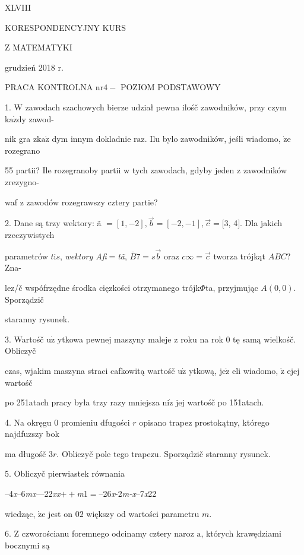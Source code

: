 \documentclass[a4paper,12pt]{article}
\begin{document}
XLVIII

KORESPONDENCYJNY KURS

Z MATEMATYKI

grudzień 2018 r.

PRACA KONTROLNA $\mathrm{n}\mathrm{r} 4-$ POZIOM PODSTAWOWY

1. $\mathrm{W}$ zawodach szachowych bierze udział pewna ilośč zawodników, przy czym $\mathrm{k}\mathrm{a}\dot{\mathrm{z}}\mathrm{d}\mathrm{y}$ zawod-

nik gra $\mathrm{z}\mathrm{k}\mathrm{a}\dot{\mathrm{z}}$ dym innym dokladnie $\mathrm{r}\mathrm{a}\mathrm{z}$. Ilu bylo zawodników, jeśli wiadomo, $\dot{\mathrm{z}}\mathrm{e}$ rozegrano

55 partii? Ile rozegranoby partii $\mathrm{w}$ tych zawodach, gdyby jeden $\mathrm{z}$ zawodników zrezygno-

waf $\mathrm{z}$ zawodów rozegrawszy cztery partie?

2. Dane są trzy wektory: ã $= [1,-2], \vec{b}= [-2,-1], \vec{c}= [3$, 4$]$. Dla jakich rzeczywistych

parametrów $t\mathrm{i}s$, {\it wektory Afi}$=${\it tã}, $\overline{B}7=s\vec{b}$ oraz $c\infty=\vec{c}$ tworza trójkąt $ABC$? Zna-

lez/č wspófrzędne środka cięzkości otrzymanego trójk$\Phi$ta, przyjmując $A(0,0)$. Sporządzič

staranny rysunek.

3. Wartośč $\mathrm{u}\dot{\mathrm{z}}$ ytkowa pewnej maszyny maleje $\mathrm{z}$ roku na rok $0$ tę samą wielkośč. Obliczyč

czas, wjakim maszyna straci cafkowitą wartośč $\mathrm{u}\dot{\mathrm{z}}$ ytkową, $\mathrm{j}\mathrm{e}\dot{\mathrm{z}}$ eli wiadomo, $\dot{\mathrm{z}}$ ejej wartośč

po 251atach pracy była trzy razy mniejsza $\mathrm{n}\mathrm{i}\dot{\mathrm{z}}$ jej wartośč po 151atach.

4. Na okręgu $0$ promieniu dfugości $r$ opisano trapez prostokątny, którego najdfuzszy bok

ma długośč $3r$. Obliczyč pole tego trapezu. Sporządzič staranny rysunek.

5. Obliczyč pierwiastek równania

--4{\it x}--6{\it mx}---22{\it xx}$++${\it m}1$=$--26{\it x}-2{\it m-x}--7{\it x}22

wiedząc, $\dot{\mathrm{z}}\mathrm{e}$ jest on $02$ większy od wartości parametru $m.$

6. $\mathrm{Z}$ czworościanu foremnego odcinamy cztery naroz $\mathrm{a}$, których krawędziami bocznymi są
\end{document}

